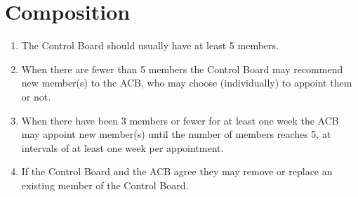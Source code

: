 \documentclass[]{article}
\begin{document}
\section{Composition}
\label{sec:composition}

\begin{enumerate}
\item The Control Board should usually have at least 5 members.

\item When there are fewer than 5 members the Control Board may recommend new member(s) to the ACB, who may choose (individually) to appoint them or not.

\item When there have been 3 members or fewer for at least one week the ACB may appoint new member(s) until the number of members reaches 5, at intervals of at least one week per appointment.

\item If the Control Board and the ACB agree they may remove or replace an existing member of the Control Board.

\end{enumerate}
\end{document}
